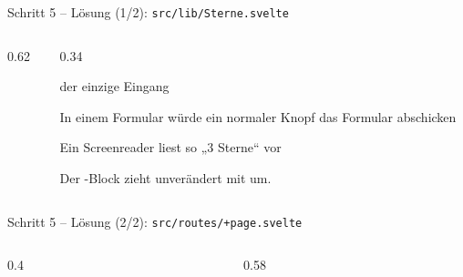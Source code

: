 \begin{loesung}
\begin{frame}[fragile]{Schritt 5 -- Lösung (1/2): \texttt{src/lib/Sterne.svelte}}
  \begin{columns}[onlytextwidth,t]
    \begin{column}{0.62\textwidth}
    \end{column}
    \begin{column}{0.34\textwidth}
      \footnotesize
      \begin{tugitemize}
        \item[3] der einzige Eingang
        \item[9] In einem Formular würde ein normaler Knopf das Formular abschicken
        \item[11] Ein Screenreader liest so „3 Sterne“ vor
      \end{tugitemize}
      \vspace{0.3em}
      Der -Block zieht unverändert mit um.
    \end{column}
  \end{columns}
\end{frame}

\begin{frame}[fragile]{Schritt 5 -- Lösung (2/2): \texttt{src/routes/+page.svelte}}
  \begin{columns}[onlytextwidth,t]
    \begin{column}{0.4\textwidth}
    \end{column}
    \begin{column}{0.58\textwidth}
    \end{column}
  \end{columns}
\end{frame}
\end{loesung}

